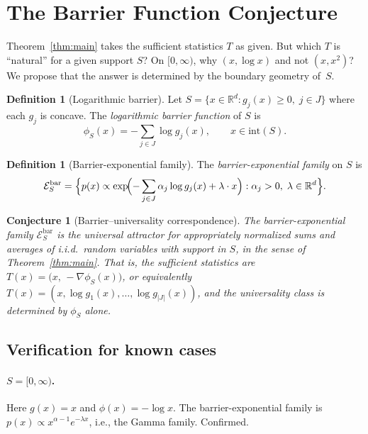 \documentclass[aps,pre,twocolumn,superscriptaddress,nofootinbib]{revtex4-2}
\newtheorem{conjecture}[theorem]{Conjecture}
\theoremstyle{definition}
\newtheorem{definition}[theorem]{Definition}
\theoremstyle{remark}
\newcommand{\R}{\mathbb{R}}
\newcommand{\inte}{\mathrm{int}}
\begin{document}
\section{The Barrier Function Conjecture}\label{sec:barrier}

Theorem~\ref{thm:main} takes the sufficient statistics $T$ as given.  But
which $T$ is ``natural'' for a given support $S$?  On $[0,\infty)$, why
$(x,\log x)$ and not $(x,x^2)$?  We propose that the answer is determined by
the boundary geometry of~$S$.

\begin{definition}[Logarithmic barrier]
Let $S=\{x\in\R^d:g_j(x)\ge 0,\;j\in J\}$ where each $g_j$ is concave.  The
\emph{logarithmic barrier function} of $S$ is
\begin{equation}\label{eq:barrier}
\phi_S(x)=-\sum_{j\in J}\log g_j(x),\qquad x\in\inte(S).
\end{equation}
\end{definition}

\begin{definition}[Barrier-exponential family]
The \emph{barrier-exponential family} on $S$ is
\begin{equation}\label{eq:barrier-family}
\mathcal{E}_S^{\mathrm{bar}}=\Bigl\{p(x)\propto
\exp\!\Bigl({-}\sum_{j\in J}\alpha_j\log g_j(x)+\lambda\cdot x\Bigr):
\alpha_j>0,\;\lambda\in\R^d\Bigr\}.
\end{equation}
\end{definition}

\begin{conjecture}[Barrier--universality correspondence]\label{conj:barrier}
The barrier-exponential family $\mathcal{E}_S^{\mathrm{bar}}$ is the universal
attractor for appropriately normalized sums and averages of i.i.d.\ random
variables with support in $S$, in the sense of Theorem~\ref{thm:main}.
That is, the sufficient statistics are
$T(x)=\bigl(x,\,-\nabla\phi_S(x)\bigr)$,
or equivalently $T(x)=(x,\log g_1(x),\ldots,\log g_{|J|}(x))$, and the
universality class is determined by $\phi_S$ alone.
\end{conjecture}

\subsection{Verification for known cases}

\paragraph{$S=[0,\infty)$.}  Here $g(x)=x$ and $\phi(x)=-\log x$.  The
barrier-exponential family is $p(x)\propto x^{\alpha-1}e^{-\lambda x}$, i.e.,
the Gamma family.  Confirmed.
\end{document}
